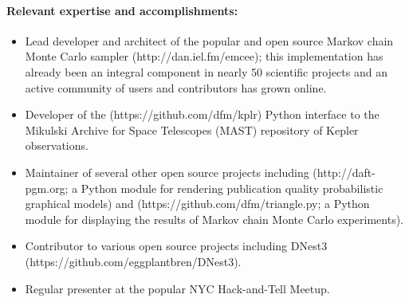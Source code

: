 \documentclass[letterpaper,12pt]{article}
\begin{document}
\paragraph{Relevant expertise and accomplishments:}
\begin{itemize}\setlength{\itemsep}{0pt}
\item
Lead developer and architect of the popular and open source Markov chain
Monte Carlo sampler  (http://dan.iel.fm/emcee); this
implementation has already been an integral component in nearly 50 scientific
projects and an active community of users and contributors has grown online.
\item
Developer of the  (https://github.com/dfm/kplr) Python interface
to the Mikulski Archive for Space Telescopes (MAST) repository of Kepler
observations.
\item
Maintainer of several other open source projects including 
 (http://daft-pgm.org; a Python module for rendering publication quality
probabilistic graphical models) and 
 (https://github.com/dfm/triangle.py; a Python module for displaying the
results of Markov chain Monte Carlo experiments).
\item
Contributor to various open source projects including DNest3
 (https://github.com/eggplantbren/DNest3).
\item
Regular presenter at the popular NYC Hack-and-Tell Meetup.
\end{itemize}
\end{document}
